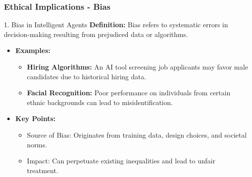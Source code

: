 \documentclass[aspectratio=169]{beamer}
\begin{document}
\begin{frame}[fragile]
    \frametitle{Ethical Implications - Bias}
    \begin{block}{1. Bias in Intelligent Agents}
        \textbf{Definition:} Bias refers to systematic errors in decision-making resulting from prejudiced data or algorithms.
        \begin{itemize}
            \item \textbf{Examples:}
            \begin{itemize}
                \item \textbf{Hiring Algorithms:} An AI tool screening job applicants may favor male candidates due to historical hiring data.
                \item \textbf{Facial Recognition:} Poor performance on individuals from certain ethnic backgrounds can lead to misidentification.
            \end{itemize}
            \item \textbf{Key Points:}
            \begin{itemize}
                \item Source of Bias: Originates from training data, design choices, and societal norms.
                \item Impact: Can perpetuate existing inequalities and lead to unfair treatment.
            \end{itemize}
        \end{itemize}
    \end{block}
\end{frame}
\end{document}
